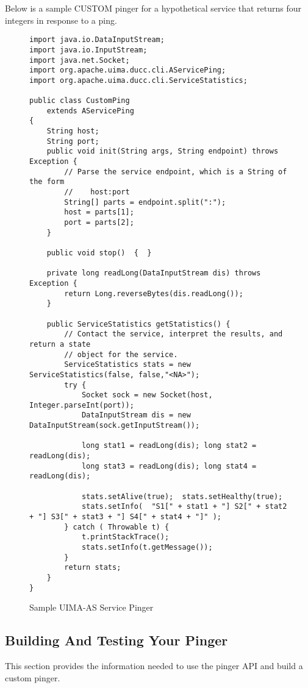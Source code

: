       Below is a sample CUSTOM pinger for a hypothetical service that returns four integers in
      response to a ping.
      \begin{figure}[H]
\begin{verbatim}
import java.io.DataInputStream;
import java.io.InputStream;
import java.net.Socket;
import org.apache.uima.ducc.cli.AServicePing;
import org.apache.uima.ducc.cli.ServiceStatistics;

public class CustomPing
    extends AServicePing
{
    String host;
    String port;
    public void init(String args, String endpoint) throws Exception {
        // Parse the service endpoint, which is a String of the form 
        //    host:port
        String[] parts = endpoint.split(":");
        host = parts[1];
        port = parts[2];
    }

    public void stop()  {  }

    private long readLong(DataInputStream dis) throws Exception {
        return Long.reverseBytes(dis.readLong());
    }

    public ServiceStatistics getStatistics() {
        // Contact the service, interpret the results, and return a state
        // object for the service.
        ServiceStatistics stats = new ServiceStatistics(false, false,"<NA>");
        try {
            Socket sock = new Socket(host, Integer.parseInt(port));
            DataInputStream dis = new DataInputStream(sock.getInputStream());

            long stat1 = readLong(dis); long stat2 = readLong(dis); 
            long stat3 = readLong(dis); long stat4 = readLong(dis);

            stats.setAlive(true);  stats.setHealthy(true);
            stats.setInfo(  "S1[" + stat1 + "] S2[" + stat2 + "] S3[" + stat3 + "] S4[" + stat4 + "]" );
        } catch ( Throwable t) {
        	t.printStackTrace();
            stats.setInfo(t.getMessage());
        }
        return stats;        
    }
}
\end{verbatim}
        \caption{Sample UIMA-AS Service Pinger}
        \label{fig:service.custom.pinger}

      \end{figure}
      
      \subsection{Building And Testing Your Pinger}
      This section provides the information needed to use the pinger API and build a
      custom pinger. 

